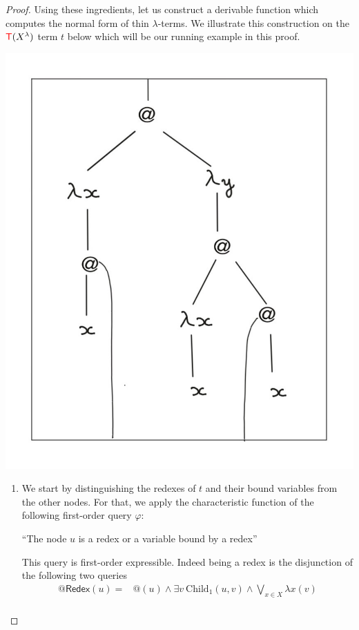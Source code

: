 \begin{proof}
Using these ingredients, let us construct a derivable function which computes the normal form of thin $\lambda$-terms. We illustrate this construction on the $\tmonad(X^\lambda)$ term $t$ below which will be our running example in this proof. 
\begin{center}
\includegraphics[scale=.15]{MyPic14.jpg}
\end{center}
\begin{enumerate}
\item
We start by distinguishing the redexes of $t$ and their bound variables from the other nodes. For that, we apply the characteristic function of the following first-order query $\varphi$:
    \begin{center}
    ``The node $u$ is a redex or a variable bound by a redex''
    \end{center}
    This query is first-order expressible. Indeed being a redex is the disjunction of the following two queries
$$\begin{array}{rl}
@\mathsf{Redex}(u) = & @(u) \wedge \exists v \ \mathrm{Child}_1(u,v) \wedge \bigvee_{x\in X}\lambda x(v)\\

\end{array}$$
\end{enumerate}
\end{proof}
